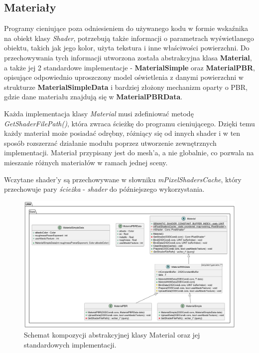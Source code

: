 \subsection{Materiały}
	Programy cieniujące poza odniesieniem do używanego kodu w formie wskaźnika na obiekt klasy \textit{Shader}, potrzebują także informacji o parametrach wyświetlanego obiektu, takich jak jego kolor, użyta tekstura i inne właściwości powierzchni.	Do przechowywania tych informacji utworzona została abstrakcyjna klasa \textbf{Material}, a także jej 2 standardowe implementacje - \textbf{MaterialSimple} oraz \textbf{MaterialPBR}, opisujące odpowiednio uproszczony model oświetlenia z danymi powierzchni w strukturze \textbf{MaterialSimpleData} i bardziej złożony mechanizm oparty o PBR, gdzie dane materiału znajdują się w \textbf{MaterialPBRData}.
	
	Każda implementacja klasy \textit{Material} musi zdefiniować metodę \textit{GetShaderFilePath()}, która zwraca ścieżkę do programu cieniującego. Dzięki temu każdy materiał może posiadać odrębny, różniący się od innych shader i w ten sposób rozszerzać działanie modułu poprzez utworzenie zewnętrznych implementacji. Materiał przypisany jest do mesh'a, a nie globalnie, co pozwala na mieszanie różnych materiałów w ramach jednej sceny.
	
	Wczytane shader'y są przechowywane w słowniku \textit{mPixelShadersCache}, który przechowuje pary \textit{ścieżka} - \textit{shader} do późniejszego wykorzystania.

	\vfill
	\clearpage
		
	\begin{figure}[h!]
		\centering
		\includegraphics[width=\textwidth]{images/UML/materials.png}
		\caption{Schemat kompozycji abstrakcyjnej klasy Material oraz jej standardowych implementacji.}
		\label{UML_Material}
	\end{figure}

